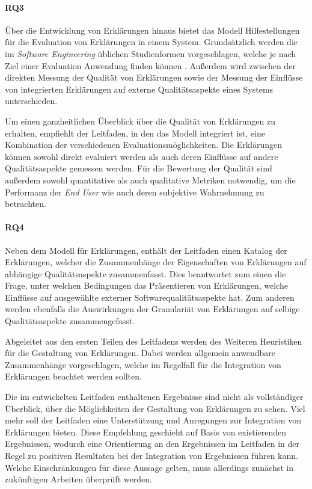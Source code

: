 \paragraph{RQ3} Über die Entwicklung von Erklärungen hinaus bietet das Modell Hilfestellungen für die Evaluation von Erklärungen in einem System. Grundsätzlich werden die im \textit{Software Engineering} üblichen Studienformen vorgeschlagen, welche je nach Ziel einer Evaluation Anwendung finden können \cite[vgl.][]{wohlin2012experimentation}. Außerdem wird zwischen der direkten Messung der Qualität von Erklärungen sowie der Messung der Einflüsse von integrierten Erklärungen auf externe Qualitätsaspekte eines Systems unterschieden.

Um einen ganzheitlichen Überblick über die Qualität von Erklärungen zu erhalten, empfiehlt der Leitfaden, in den das Modell integriert ist, eine Kombination der verschiedenen Evaluationsmöglichkeiten. Die Erklärungen können sowohl direkt evaluiert werden als auch deren Einflüsse auf andere Qualitätsaspekte gemessen werden. Für die Bewertung der Qualität sind außerdem sowohl quantitative als auch qualitative Metriken notwendig, um die Performanz der \textit{End User} wie auch deren subjektive Wahrnehmung zu betrachten.

\paragraph{RQ4} Neben dem Modell für Erklärungen, enthält der Leitfaden einen Katalog der Erklärungen, welcher die Zusammenhänge der Eigenschaften von Erklärungen auf abhängige Qualitätsaspekte zusammenfasst. Dies beantwortet zum einen die Frage, unter welchen Bedingungen das Präsentieren von Erklärungen, welche Einflüsse auf ausgewählte externer Softwarequalitätsaspekte hat. Zum anderen werden ebenfalls die Auswirkungen der Granulariät von Erklärungen auf selbige Qualitätsaspekte zusammengefasst.

\bigskip

Abgeleitet aus den ersten Teilen des Leitfadens werden des Weiteren Heuristiken für die Gestaltung von Erklärungen. Dabei werden allgemein anwendbare Zusammenhänge vorgeschlagen, welche im Regelfall für die Integration von Erklärungen beachtet werden sollten.

\bigskip

Die im entwickelten Leitfaden enthaltenen Ergebnisse sind nicht als vollständiger Überblick, über die Möglichkeiten der Gestaltung von Erklärungen zu sehen. Viel mehr soll der Leitfaden eine Unterstützung und Anregungen zur Integration von Erklärungen bieten. Diese Empfehlung geschieht auf Basis von existierenden Ergebnissen, wodurch eine Orientierung an den Ergebnissen im Leitfaden in der Regel zu positiven Resultaten bei der Integration von Ergebnissen führen kann. Welche Einschränkungen für diese Aussage gelten, muss allerdings zunächst in zukünftigen Arbeiten überprüft werden.

